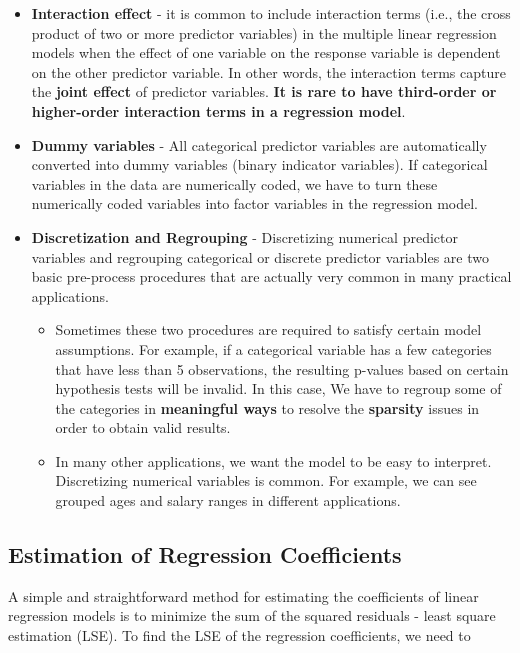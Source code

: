 \documentclass[
]{book}
\begin{document}
\begin{itemize}
\item
  \textbf{Interaction effect} - it is common to include interaction terms (i.e., the cross product of two or more predictor variables) in the multiple linear regression models when the effect of one variable on the response variable is dependent on the other predictor variable. In other words, the interaction terms capture the \textbf{joint effect} of predictor variables. \textbf{It is rare to have third-order or higher-order interaction terms in a regression model}.
\item
  \textbf{Dummy variables} - All categorical predictor variables are automatically converted into dummy variables (binary indicator variables). If categorical variables in the data are numerically coded, we have to turn these numerically coded variables into factor variables in the regression model.
\item
  \textbf{Discretization and Regrouping} - Discretizing numerical predictor variables and regrouping categorical or discrete predictor variables are two basic pre-process procedures that are actually very common in many practical applications.

  \begin{itemize}
  \item
    Sometimes these two procedures are required to satisfy certain model assumptions. For example, if a categorical variable has a few categories that have less than 5 observations, the resulting p-values based on certain hypothesis tests will be invalid. In this case, We have to regroup some of the categories in \textbf{meaningful ways} to resolve the \textbf{sparsity} issues in order to obtain valid results.
  \item
    In many other applications, we want the model to be easy to interpret. Discretizing numerical variables is common. For example, we can see grouped ages and salary ranges in different applications.
  \end{itemize}
\end{itemize}

\hypertarget{estimation-of-regression-coefficients}{%
\subsection{Estimation of Regression Coefficients}\label{estimation-of-regression-coefficients}}

A simple and straightforward method for estimating the coefficients of linear regression models is to minimize the sum of the squared residuals - least square estimation (LSE). To find the LSE of the regression coefficients, we need to
\end{document}
